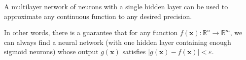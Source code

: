 \begin{corollary}
    A multilayer network of neurons with a single hidden layer can be used to approximate any continuous function to any desired precision. 
\end{corollary}

In other words, there is a guarantee that for any function \( f(\mathbf{x}) : \mathbb{R}^n \to \mathbb{R}^m \), we can always find a neural network (with one hidden layer containing enough sigmoid neurons) whose output \( g(\mathbf{x}) \) satisfies \( |g(\mathbf{x}) - f(\mathbf{x})| < \varepsilon \).
